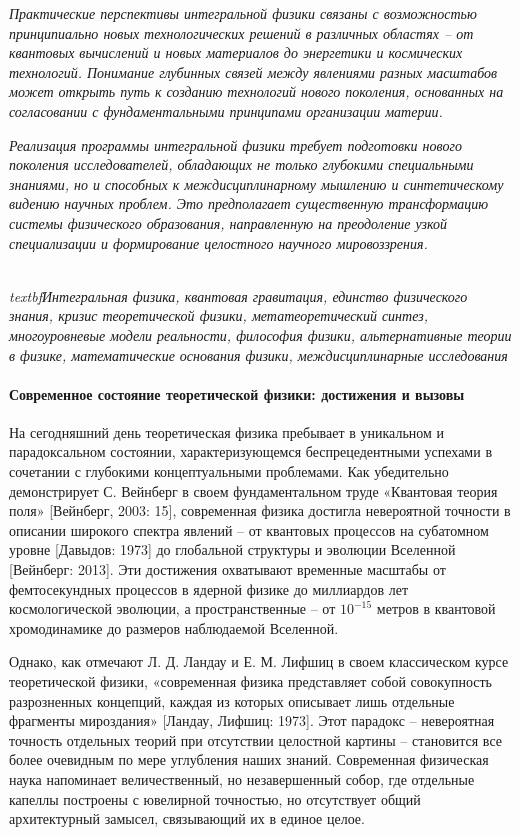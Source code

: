     \textit{Практические перспективы интегральной физики связаны с возможностью принципиально новых технологических решений в различных областях – от квантовых вычислений и новых материалов до энергетики и космических технологий. Понимание глубинных связей между явлениями разных масштабов может открыть путь к созданию технологий нового поколения, основанных на согласовании с фундаментальными принципами организации материи.}

    \textit{Реализация программы интегральной физики требует подготовки нового поколения исследователей, обладающих не только глубокими специальными знаниями, но и способных к междисциплинарному мышлению и синтетическому видению научных проблем. Это предполагает существенную трансформацию системы физического образования, направленную на преодоление узкой специализации и формирование целостного научного мировоззрения.}

    \textit{\\textbf{Интегральная физика, квантовая гравитация, единство физического знания, кризис теоретической физики, метатеоретический синтез, многоуровневые модели реальности, философия физики, альтернативные теории в физике, математические основания физики, междисциплинарные исследования}}

    \paragraph*{Современное состояние теоретической физики: достижения и вызовы}
    На сегодняшний день теоретическая физика пребывает в уникальном и парадоксальном состоянии, характеризующемся беспрецедентными успехами в сочетании с глубокими концептуальными проблемами. Как убедительно демонстрирует С. Вейнберг в своем фундаментальном труде «Квантовая теория поля» [Вейнберг, 2003: 15], современная физика достигла невероятной точности в описании широкого спектра явлений – от квантовых процессов на субатомном уровне [Давыдов: 1973] до глобальной структуры и эволюции Вселенной [Вейнберг: 2013]. Эти достижения охватывают временные масштабы от фемтосекундных процессов в ядерной физике до миллиардов лет космологической эволюции, а пространственные – от $10^{-15}$ метров в квантовой хромодинамике до размеров наблюдаемой Вселенной.

    Однако, как отмечают Л. Д. Ландау и Е. М. Лифшиц в своем классическом курсе теоретической физики, «современная физика представляет собой совокупность разрозненных концепций, каждая из которых описывает лишь отдельные фрагменты мироздания» [Ландау, Лифшиц: 1973]. Этот парадокс – невероятная точность отдельных теорий при отсутствии целостной картины – становится все более очевидным по мере углубления наших знаний. Современная физическая наука напоминает величественный, но незавершенный собор, где отдельные капеллы построены с ювелирной точностью, но отсутствует общий архитектурный замысел, связывающий их в единое целое.

